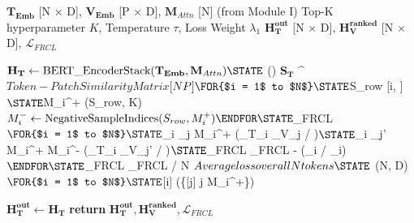 \documentclass[12pt]{article}
\begin{document}
\begin{algorithm}
\caption{FRCL Encoder and Alignment Engine}
\label{alg:module2}
\begin{algorithmic}[1]
\REQUIRE $\mathbf{T_{Emb}}$ [N $\times$ D], $\mathbf{V_{Emb}}$ [P $\times$ D], $\mathbf{M}_{Attn}$ [N] (from Module I)
\REQUIRE Top-K hyperparameter $K$, Temperature $\tau$, Loss Weight $\lambda_1$
\ENSURE $\mathbf{H_{T}^{out}}$ [N $\times$ D], $\mathbf{H_{V}^{ranked}}$ [N $\times$ D], $\mathcal{L}_{FRCL}$
\vspace{0.5cm}

\STATE $\mathbf{H_T} \leftarrow \text{BERT\_EncoderStack}(\mathbf{T_{Emb}}, \mathbf{M}_{Attn})
\STATE $ \leftarrow {}()
\STATE $\mathbf{S_T}$ \leftarrow {} \cdot {}^\top \quad \triangleright$ Token-Patch Similarity Matrix [N $\times$ P]
\FOR{$i = 1$ to $N$}
    \STATE $S_{row} \leftarrow {}[i, \cdot]$
    \STATE $M_i^+ \leftarrow {}(S_{row}, K)
    \STATE $M_i^- \leftarrow \text{NegativeSampleIndices}(S_{row}, M_i^+) 
\ENDFOR

\STATE $_{FRCL} $
\FOR{$i = 1$ to $N$}
    \STATE $_i \leftarrow \sum_{j \in M_i^+} \exp(_{T_i} \cdot {}_{V_j} / \tau)$
    \STATE $_i \leftarrow \sum_{j' \in M_i^+ \cup M_i^-} \exp(_{T_i} \cdot {}_{V_{j'}} / \tau)$
    \STATE $_{FRCL} \leftarrow {}_{FRCL} - \log(_i / _i)$
\ENDFOR
\STATE $_{FRCL} \leftarrow {}_{FRCL} / N \quad \triangleright$ Average loss over all N tokens

\STATE $ \leftarrow {}(N, D)$
\FOR{$i = 1$ to $N$}
    \STATE $[i] \leftarrow {}(\{[j] \mid j \in M_i^+\})
\ENDFOR

\STATE $\mathbf{H_{T}^{out}} \leftarrow \mathbf{H_T}$
\STATE \textbf{return} $\mathbf{H_{T}^{out}}, \mathbf{H_{V}^{ranked}}, \mathcal{L}_{FRCL}$
\end{algorithmic}
\end{algorithm}
\end{document}
